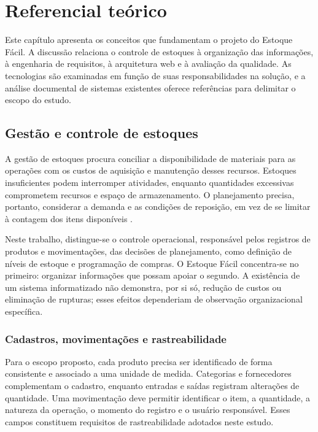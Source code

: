 \chapter{Referencial teórico}
\label{cap:referencial}

Este capítulo apresenta os conceitos que fundamentam o projeto do Estoque Fácil. A discussão relaciona o controle de estoques à organização das informações, à engenharia de requisitos, à arquitetura web e à avaliação da qualidade. As tecnologias são examinadas em função de suas responsabilidades na solução, e a análise documental de sistemas existentes oferece referências para delimitar o escopo do estudo.

\section{Gestão e controle de estoques}

A gestão de estoques procura conciliar a disponibilidade de materiais para as operações com os custos de aquisição e manutenção desses recursos. Estoques insuficientes podem interromper atividades, enquanto quantidades excessivas comprometem recursos e espaço de armazenamento. O planejamento precisa, portanto, considerar a demanda e as condições de reposição, em vez de se limitar à contagem dos itens disponíveis \cite{OpenStaxEstoques}.

Neste trabalho, distingue-se o controle operacional, responsável pelos registros de produtos e movimentações, das decisões de planejamento, como definição de níveis de estoque e programação de compras. O Estoque Fácil concentra-se no primeiro: organizar informações que possam apoiar o segundo. A existência de um sistema informatizado não demonstra, por si só, redução de custos ou eliminação de rupturas; esses efeitos dependeriam de observação organizacional específica.

\subsection{Cadastros, movimentações e rastreabilidade}

Para o escopo proposto, cada produto precisa ser identificado de forma consistente e associado a uma unidade de medida. Categorias e fornecedores complementam o cadastro, enquanto entradas e saídas registram alterações de quantidade. Uma movimentação deve permitir identificar o item, a quantidade, a natureza da operação, o momento do registro e o usuário responsável. Esses campos constituem requisitos de rastreabilidade adotados neste estudo.

